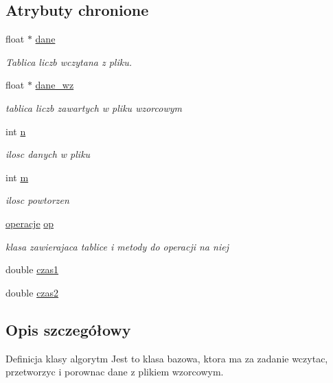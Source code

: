 \subsection*{\-Atrybuty chronione}
\begin{DoxyCompactItemize}
\item 
float $\ast$ \hyperlink{classalgorytm_a5dd6d510b611002cfb9737f12eeff63f}{dane}
\begin{DoxyCompactList}\small\item\em \-Tablica liczb wczytana z pliku. \end{DoxyCompactList}\item 
float $\ast$ \hyperlink{classalgorytm_a93fb0f7a64eb1e4f8492445395f98e5f}{dane\-\_\-wz}
\begin{DoxyCompactList}\small\item\em tablica liczb zawartych w pliku wzorcowym \end{DoxyCompactList}\item 
int \hyperlink{classalgorytm_a2778c37f0ec06a30b7d494501c40e91a}{n}
\begin{DoxyCompactList}\small\item\em ilosc danych w pliku \end{DoxyCompactList}\item 
int \hyperlink{classalgorytm_ac9429e88b0630a008df4d011458ee5a2}{m}
\begin{DoxyCompactList}\small\item\em ilosc powtorzen \end{DoxyCompactList}\item 
\hyperlink{classoperacje}{operacje} \hyperlink{classalgorytm_aedaee1aa41206b5f050fe660d0846f2d}{op}
\begin{DoxyCompactList}\small\item\em klasa zawierajaca tablice i metody do operacji na niej \end{DoxyCompactList}\item 
double \hyperlink{classalgorytm_a4dae8e390930e55b11f9e0f4efd9edaf}{czas1}
\item 
double \hyperlink{classalgorytm_abf8a655cd9b1acea00ba90893d38567b}{czas2}
\end{DoxyCompactItemize}


\subsection{\-Opis szczegółowy}
\-Definicja klasy algorytm \-Jest to klasa bazowa, ktora ma za zadanie wczytac, przetworzyc i porownac dane z plikiem wzorcowym. 

